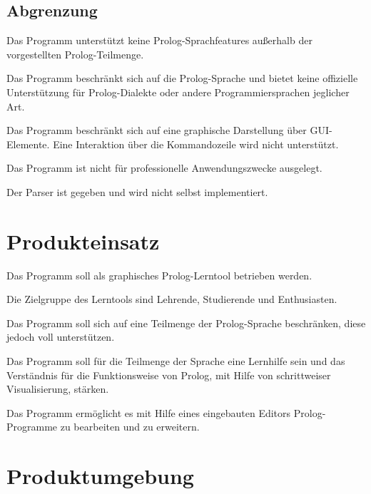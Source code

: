 \documentclass[parskip=full,11pt,twoside]{scrartcl}
\begin{document}
\subsection{Abgrenzung}


Das Programm unterstützt keine Prolog-Sprachfeatures außerhalb der vorgestellten Prolog-Teilmenge.


Das Programm beschränkt sich auf die Prolog-Sprache und bietet keine offizielle Unterstützung für Prolog-Dialekte oder andere Programmiersprachen jeglicher Art.


Das Programm beschränkt sich auf eine graphische Darstellung über GUI-Elemente. Eine Interaktion über die Kommandozeile wird nicht unterstützt.


Das Programm ist nicht für professionelle Anwendungszwecke ausgelegt.


Der Parser ist gegeben und wird nicht selbst implementiert.

\section{Produkteinsatz}

Das Programm soll als graphisches Prolog-Lerntool betrieben werden.

Die Zielgruppe des Lerntools sind Lehrende, Studierende und Enthusiasten.

Das Programm soll sich auf eine Teilmenge der Prolog-Sprache beschränken, diese jedoch voll unterstützen.

Das Programm soll für die Teilmenge der Sprache eine Lernhilfe sein und das Verständnis für die Funktionsweise von Prolog, mit Hilfe von schrittweiser Visualisierung, stärken.

Das Programm ermöglicht es mit Hilfe eines eingebauten Editors Prolog-Programme zu bearbeiten und zu erweitern.

\section{Produktumgebung}
\end{document}
